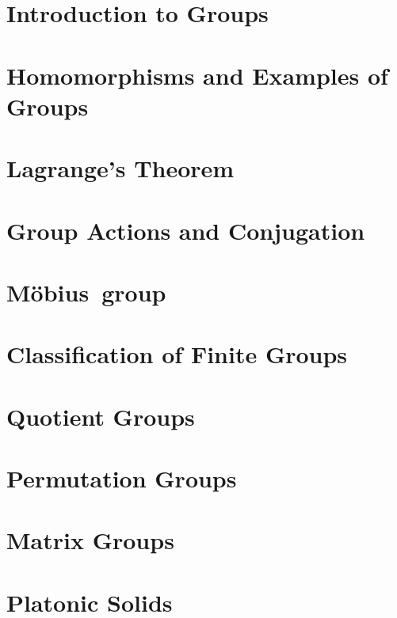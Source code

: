 \documentclass[british,11pt,a4paper]{report}
\newcommand{\Mobius}{M\"obius}
\begin{document}
\maketitle
\tableofcontents
\chapter{Introduction to Groups} %

\chapter{Homomorphisms and Examples of Groups} %

\chapter{Lagrange's Theorem} %
\chapter{Group Actions and Conjugation} %

\chapter{\Mobius~group} %
\chapter{Classification of Finite Groups} %
\chapter{Quotient Groups} %
\chapter{Permutation Groups} %

\chapter{Matrix Groups}

\chapter{Platonic Solids}

\end{document}
